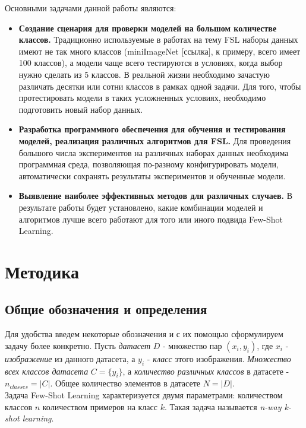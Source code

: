 \documentclass[a4paper, 12pt]{report}
\begin{document}
Основными задачами данной работы являются:
\begin{itemize}

\item \textbf {Создание сценария для проверки моделей на большом количестве классов.} Традиционно используемые в работах на тему FSL наборы данных имеют не так много классов (miniImageNet [ссылка], к примеру, всего имеет 100 классов), а модели чаще всего тестируются в условиях, когда выбор нужно сделать из 5 классов. В реальной жизни необходимо зачастую различать десятки или сотни классов в рамках одной задачи. Для того, чтобы протестировать модели в таких усложненных условиях, необходимо подготовить новый набор данных.

\item \textbf {Разработка программного обеспечения для обучения и тестирования моделей, реализация различных алгоритмов для FSL.} Для проведения большого числа экспериментов на различных наборах данных необходима  программная среда, позволяющая по-разному конфигурировать модели, автоматически сохранять результаты экспериментов и обученные модели.

\item \textbf {Выявление наиболее эффективных методов для различных случаев.} В результате работы будет установлено, какие комбинации моделей и алгоритмов лучше всего работают для того или иного подвида Few-Shot Learning.

\end{itemize}

\chapter{Методика}

\section {Общие обозначения и определения}

Для удобства введем некоторые обозначения и с их помощью сформулируем задачу более конкретно. Пусть \textit{датасет} $D$ - множество пар $(x_i, y_i)$, где $x_i$ - \textit{изображение} из данного датасета, а $y_i$ - \textit{класс} этого изображения. \textit{Множество всех классов датасета} $C = \{y_i\}$, а \textit{количество различных классов} в датасете - $n_{classes} = |C|$. Общее количество элементов в датасете $N = |D|$. \\

Задача Few-Shot Learning характеризуется двумя параметрами: количеством классов $n$ количеством примеров на класс $k$. Такая задача называется \textit{n-way k-shot learning}. \\
\end{document}
